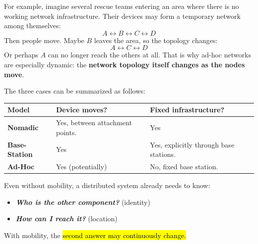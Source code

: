 \begin{itemize}
        For example, imagine several rescue teams entering an area where there is no working network infrastructure. Their devices may form a temporary network among themselves:
        \begin{equation*}
            A \leftrightarrow B \leftrightarrow C \leftrightarrow D
        \end{equation*}
        Then people move. Maybe $B$ leaves the area, so the topology changes:
        \begin{equation*}
            A \leftrightarrow C \leftrightarrow D
        \end{equation*}
        Or perhaps $A$ can no longer reach the others at all. That is why ad-hoc networks are especially dynamic: the \textbf{network topology itself changes as the nodes move}.
\end{itemize}
The three cases can be summarized as follows:

\begin{center}
    \begin{tabular}{@{} l p{11em} p{12em} @{}}
        \toprule
        \textbf{Model} & \textbf{Device moves?} & \textbf{Fixed infrastructure?} \\
        \midrule
        \textbf{Nomadic} & Yes, between attachment points. & Yes \\[1.7em]
        \textbf{Base-Station} & Yes & Yes, explicitly through base stations. \\[.3em]
        \textbf{Ad-Hoc} & Yes (potentially) & No, fixed base station. \\
        \bottomrule
    \end{tabular}
\end{center}

\noindent
Even without mobility, a distributed system already needs to know:
\begin{itemize}
    \item \emph{\textbf{Who is the other component?}} (identity)
    \item \emph{\textbf{How can I reach it?}} (location)
\end{itemize}
With mobility, the \hl{second answer may continuously change.}


